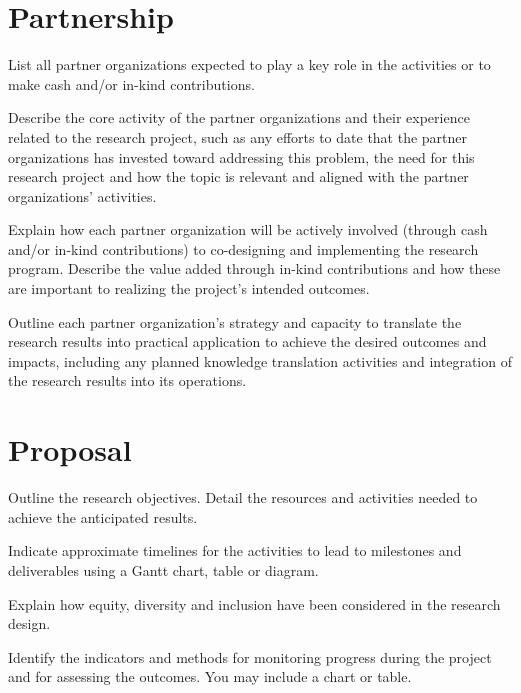 \documentclass[french]{nserc-alliance}
\begin{document}
\section*{Partnership}
\ifinst\begin{instructions}
\item List all partner organizations expected to play a key role in the activities or to make cash and/or in-kind contributions.
\item Describe the core activity of the partner organizations and their experience related to the research project, such as any efforts to date that the partner organizations has invested toward addressing this problem, the need for this research project and how the topic is relevant and aligned with the partner organizations’ activities.
\item Explain how each partner organization will be actively involved (through cash and/or in-kind contributions) to co-designing and implementing the research program. Describe the value added through in-kind contributions and how these are important to realizing the project’s intended outcomes.
\item Outline each partner organization’s strategy and capacity to translate the research results into practical application to achieve the desired outcomes and impacts, including any planned knowledge translation activities and integration of the research results into its operations.
\end{instructions}\fi


\section*{Proposal}
\ifinst\begin{instructions}
\item Outline the research objectives. Detail the resources and activities needed to achieve the anticipated results.
\item Indicate approximate timelines for the activities to lead to milestones and deliverables using a Gantt chart, table or diagram.
\item Explain how equity, diversity and inclusion have been considered in the research design.
\item Identify the indicators and methods for monitoring progress during the project and for assessing the outcomes. You may include a chart or table.
\end{instructions}\fi
\end{document}
